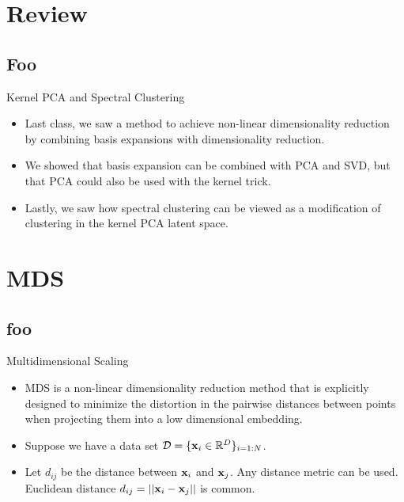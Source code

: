 \documentclass[serif,xcolor=pdftex,dvipsnames,table,hyperref={bookmarks=false,breaklinks}]{beamer}
\begin{document}
\maketitlepage


\section{Review}
\subsection{Foo}

\begin{frame}[t]{Kernel PCA and Spectral Clustering}

\begin{itemize}
\item Last class, we saw a method to achieve non-linear dimensionality reduction
by combining basis expansions with dimensionality reduction.

\pause\item We showed that basis expansion can be combined with PCA and SVD, but that
PCA could also be used with the kernel trick.

\pause\item Lastly, we saw how spectral clustering can be viewed as a modification of 
clustering in the kernel PCA latent space.

\end{itemize} 
\end{frame}


\section{MDS}
\subsection{foo}


\begin{frame}[t]{Multidimensional Scaling}

\begin{itemize}
\item MDS is a non-linear dimensionality reduction method that is explicitly 
designed to minimize the distortion in the pairwise distances 
between points when projecting them into a low dimensional embedding.

\pause\item Suppose we have a data set $\mathcal{D}= 
\{{\mathbf{x}}_i\in\mathbb{R}^D\}_{i=1:N}$. 

\pause\item Let $d_{ij}$ be the distance between ${\mathbf{x}}_i$ and ${\mathbf{x}}_j$. 
Any distance metric can be used. Euclidean distance  
$d_{ij}=||{\mathbf{x}}_i-{\mathbf{x}}_j||$ is common.

\end{itemize} 
\end{frame}
\end{document}
